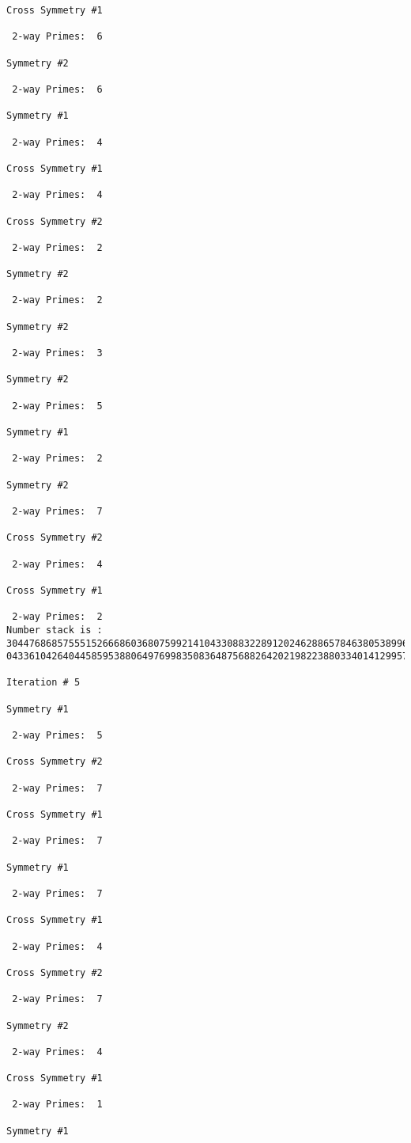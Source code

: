 \begin{verbatim}
Cross Symmetry #1

 2-way Primes: 	6

Symmetry #2

 2-way Primes: 	6

Symmetry #1

 2-way Primes: 	4

Cross Symmetry #1

 2-way Primes: 	4

Cross Symmetry #2

 2-way Primes: 	2

Symmetry #2

 2-way Primes: 	2

Symmetry #2

 2-way Primes: 	3

Symmetry #2

 2-way Primes: 	5

Symmetry #1

 2-way Primes: 	2

Symmetry #2

 2-way Primes: 	7

Cross Symmetry #2

 2-way Primes: 	4

Cross Symmetry #1

 2-way Primes: 	2
Number stack is :
30447686857555152666860368075992141043308832289120246288657846380538996794608835958544046240163340857
04336104264044585953880649769983508364875688264202198223880334014129957086306866625155575868674403758

Iteration #	5

Symmetry #1

 2-way Primes: 	5

Cross Symmetry #2

 2-way Primes: 	7

Cross Symmetry #1

 2-way Primes: 	7

Symmetry #1

 2-way Primes: 	7

Cross Symmetry #1

 2-way Primes: 	4

Cross Symmetry #2

 2-way Primes: 	7

Symmetry #2

 2-way Primes: 	4

Cross Symmetry #1

 2-way Primes: 	1

Symmetry #1


\end{verbatim}

